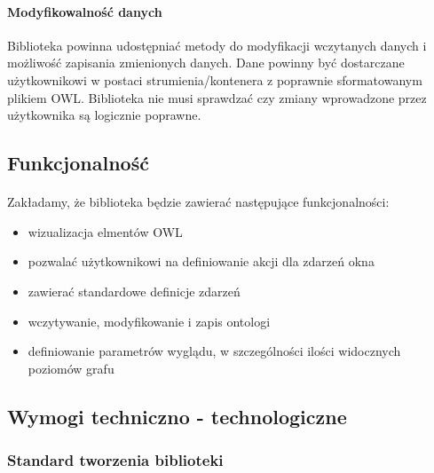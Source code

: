 \documentclass[a4paper,10pt]{article}
\begin{document}
\paragraph{Modyfikowalność danych} Biblioteka powinna udostępniać metody do modyfikacji wczytanych danych i możliwość zapisania zmienionych danych. Dane powinny być dostarczane użytkownikowi w postaci strumienia/kontenera z poprawnie sformatowanym plikiem OWL. Biblioteka nie musi sprawdzać czy zmiany wprowadzone przez użytkownika są logicznie poprawne.   

\subsection{Funkcjonalność}
\paragraph{} Zakładamy, że biblioteka będzie zawierać następujące funkcjonalności:
\begin{itemize}
 	\item wizualizacja elmentów OWL 
	\item pozwalać użytkownikowi na definiowanie akcji dla zdarzeń okna
	\item zawierać standardowe definicje zdarzeń
	\item wczytywanie, modyfikowanie i zapis ontologi
	\item definiowanie parametrów wyglądu, w szczególności ilości widocznych poziomów grafu 
\end{itemize}



\subsection{Wymogi techniczno - technologiczne}
\subsubsection{Standard tworzenia biblioteki}
\end{document}
